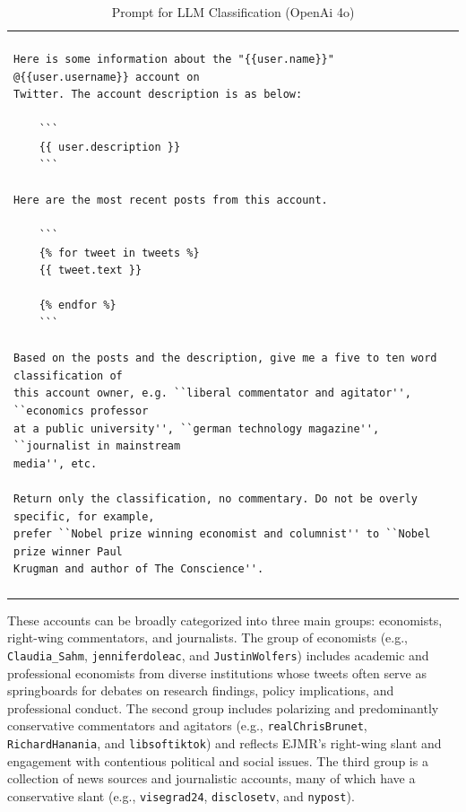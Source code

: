 \documentclass[PP]{AEA}
\begin{document}
\begin{table}
\begin{tabular}{|l|}
\hline
\\
\lstset{%
basicstyle=\footnotesize, %
stringstyle=\ttfamily, %
showstringspaces=false} %
\begin{lstlisting}[fontadjust]
Here is some information about the "{{user.name}}" @{{user.username}} account on 
Twitter. The account description is as below:

    ```
    {{ user.description }}
    ```

Here are the most recent posts from this account.

    ```
    {% for tweet in tweets %}
    {{ tweet.text }}

    {% endfor %}
    ```

Based on the posts and the description, give me a five to ten word classification of 
this account owner, e.g. ``liberal commentator and agitator'', ``economics professor 
at a public university'', ``german technology magazine'', ``journalist in mainstream 
media'', etc.

Return only the classification, no commentary. Do not be overly specific, for example, 
prefer ``Nobel prize winning economist and columnist'' to ``Nobel prize winner Paul 
Krugman and author of The Conscience''.
\end{lstlisting}
\\
\\
\hline
\end{tabular}
\caption{Prompt for LLM Classification (OpenAi 4o)}
\end{table}

These accounts can be broadly categorized into three main groups: economists, right-wing commentators, and journalists. The group of economists (e.g., \texttt{Claudia\_Sahm}, \texttt{jenniferdoleac}, and \texttt{JustinWolfers}) includes academic and professional economists from diverse institutions whose tweets often serve as springboards for debates on research findings, policy implications, and professional conduct. The second group includes polarizing and predominantly conservative commentators and agitators (e.g., \texttt{realChrisBrunet}, \texttt{RichardHanania}, and \texttt{libsoftiktok}) and reflects EJMR's right-wing slant and engagement with contentious political and social issues. The third group is a collection of news sources and journalistic accounts, many of which have a conservative slant (e.g., \texttt{visegrad24}, \texttt{disclosetv}, and \texttt{nypost}). 
\end{document}
